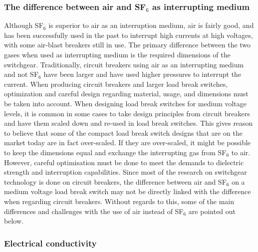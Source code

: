 \documentclass[10pt,a4paper,twoside]{article}
\begin{document}
\subsubsection{The difference between air and SF$_6$ as interrupting medium} \label{sec:airandsf}

Although SF$_6$ is superior to air as an interruption medium, air is fairly good, and has been successfully used in the past to interrupt high currents at high voltages, with some air-blast breakers still in use. The primary difference between the two gases when used as interrupting medium is the required dimensions of the switchgear. Traditionally, circuit breakers using air as an interrupting medium and not SF$_6$ have been larger and have used higher pressures to interrupt the current. When producing circuit breakers and larger load break switches, optimization and careful design regarding material, usage, and dimensions must be taken into account. When designing load break switches for medium voltage levels, it is common in some cases to take design principles from circuit breakers and have them scaled down and re-used in load break switches. This gives reason to believe that some of the compact load break switch designs that are on the market today are in fact over-scaled. If they are over-scaled, it might be possible to keep the dimensions equal and exchange the interrupting gas from SF$_6$ to air. However, careful optimisation must be done to meet the demands to dielectric strength and interruption capabilities. Since most of the research on switchgear technology is done on circuit breakers, the difference between air and SF$_6$ on a medium voltage load break switch may not be directly linked with the difference when regarding circuit breakers. Without regards to this, some of the main differences and challenges with the use of air instead of SF$_6$ are pointed out below.

\subsubsection*{Electrical conductivity}
\end{document}

